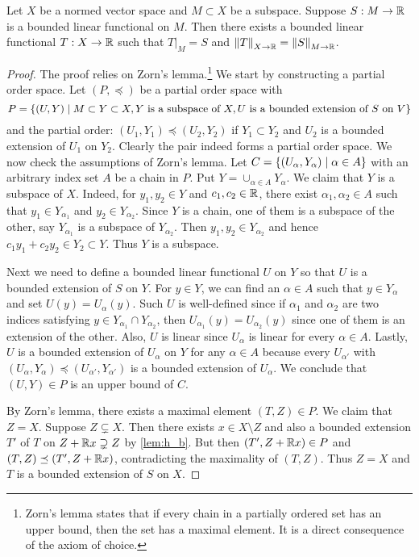 \begin{theorem}
    Let $X$ be a normed vector space and $M\subset X$ be a 
    subspace. Suppose $S:M\to\mathbb{R}$ is a bounded linear 
    functional on $M$. Then there exists a bounded linear 
    functional $T:X\to\mathbb{R}$ such that $T|_M = S$ and 
    $\left\lVert {T} \right\rVert_{X\to\mathbb{R}} = \left\lVert {S} \right\rVert_{M\to\mathbb{R}}$.
\end{theorem}
\begin{proof}
    The proof relies on Zorn's lemma.\footnote{Zorn's lemma 
    states that if every chain in a partially ordered set has an 
    upper bound, then the set has a maximal element. It is a 
    direct consequence of the axiom of choice.} We start by 
    constructing a partial order space. Let $(P,\preceq)$ be a 
    partial order space with 
    \begin{equation*}
        P = \left\{ (U,Y) \;\middle\vert\; M\subset Y\subset X, 
        Y\text{ is a subspace of }X, 
        U\text{ is a bounded extension of }S\text{ on }V \right\}
    \end{equation*}
    and the partial order: $(U_1,Y_1)\preceq (U_2,Y_2)$ if 
    $Y_1\subset Y_2$ and $U_2$ is a bounded extension of 
    $U_1$ on $Y_2$. Clearly the pair indeed forms a partial 
    order space. We now check the assumptions of Zorn's lemma. 
    Let $C = \left\{ (U_\alpha,Y_\alpha) \;\middle\vert\; \alpha\in A \right\}$ with an 
    arbitrary index set $A$ be a chain in $P$. Put $Y = 
    \cup_{\alpha\in A}Y_\alpha$. We claim that $Y$ is a subspace 
    of $X$. Indeed, for $y_1,y_2\in Y$ and $c_1,c_2\in\mathbb{R}$, there exist
    $\alpha_1,\alpha_2\in A$ such that $y_1\in Y_{\alpha_1}$ and 
    $y_2\in Y_{\alpha_2}$. Since $Y$ is a chain, one of them is 
    a subspace of the other, say $Y_{\alpha_1}$ is a subspace of 
    $Y_{\alpha_2}$. Then $y_1,y_2\in Y_{\alpha_2}$ and hence 
    $c_1y_1+c_2y_2\in Y_2\subset Y$. Thus $Y$ is a subspace. 

    Next we need to define a bounded linear functional $U$ on $Y$ 
    so that $U$ is a bounded extension of $S$ on $Y$. For $y\in Y$, 
    we can find an $\alpha\in A$ such that $y\in Y_\alpha$ and set 
    $U(y) = U_\alpha(y)$. Such $U$ is well-defined since if $\alpha_1$ 
    and $\alpha_2$ are two indices satisfying $y\in Y_{\alpha_1}\cap 
    Y_{\alpha_2}$, then $U_{\alpha_1}(y) = U_{\alpha_2}(y)$ since 
    one of them is an extension of the other. Also, $U$ is linear 
    since $U_\alpha$ is linear for every $\alpha\in A$. Lastly, $U$ 
    is a bounded extension of $U_\alpha$ on $Y$ for any $\alpha\in A$ 
    because every $U_{\alpha'}$ with $(U_{\alpha},Y_{\alpha})\preceq 
    (U_{\alpha'},Y_{\alpha'})$ is a bounded extension of $U_\alpha$. 
    We conclude that $(U,Y)\in P$ is an upper bound of $C$. 

    By Zorn's lemma, there exists a maximal element $(T,Z)\in P$. 
    We claim that $Z = X$. Suppose $Z\subsetneq X$. Then there exists 
    $x\in X\setminus Z$ and also a bounded extension $T'$ of $T$ 
    on $Z+\mathbb{R} x\supsetneq Z$ by \cref{lem:h_b}. But then $(T',Z+\mathbb{R} x)\in P$ 
    and $(T,Z)\preceq (T',Z+\mathbb{R} x)$, contradicting the maximality of 
    $(T,Z)$. Thus $Z = X$ and $T$ is a bounded extension of $S$ on $X$.
\end{proof}


